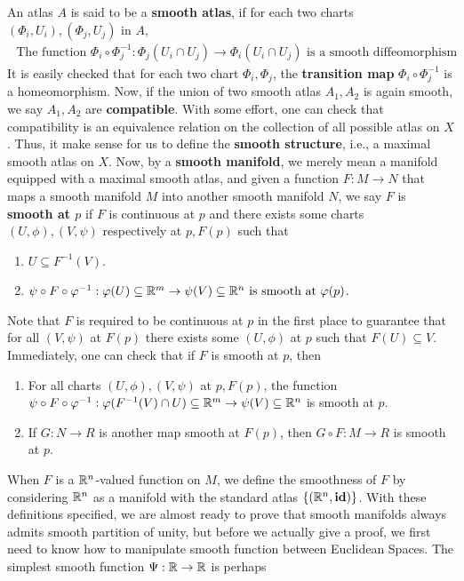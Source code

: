 \documentclass{report}
\begin{document}
\begin{mdframed}
An atlas $A$ is said to be a \textbf{smooth atlas}, if for each two charts $(\Phi_i,U_i),(\Phi_j,U_j)$ in $A$, 
\begin{align*}
\text{ The function }\Phi_i\circ \Phi_j^{-1}:\Phi_j(U_i\cap U_j)\to \Phi_i(U_i\cap U_j)\text{ is a smooth diffeomorphism }
\end{align*}
It is easily checked that for each two chart $\Phi_i,\Phi_j$, the \textbf{transition map} $\Phi_i\circ \Phi_j^{-1}$ is a homeomorphism. Now, if the union of two smooth atlas $A_1,A_2$ is again smooth, we say $A_1,A_2$ are \textbf{compatible}. With some effort, one can check that compatibility is an equivalence relation on the collection of all possible atlas on $X$. Thus, it make sense for us to define the \textbf{smooth structure}, i.e., a maximal smooth atlas on $X$. Now, by a \textbf{smooth manifold}, we merely mean a manifold equipped with a maximal smooth atlas, and given a function $F:M\rightarrow N$ that maps a smooth manifold $M$ into another smooth manifold  $N$, we say  $F$ is \textbf{smooth at $p$} if $F$ is continuous at $p$ and there exists some charts $(U,\phi),(V,\psi)$ respectively at $p,F(p)$ such that 
\begin{enumerate}[label=(\roman*)]
  \item $U \subseteq F^{-1}(V)$. 
  \item $\psi \circ F\circ \varphi^{-1} : \varphi (U) \subseteq \mathbb{R}^m \rightarrow \psi (V)\subseteq \mathbb{R}^n\text{  is smooth at }\varphi (p)$. 
\end{enumerate}
Note that $F$ is required to be continuous at $p$ in the first place to guarantee that for all $(V,\psi)$ at $F(p)$ there exists some $(U,\phi)$ at $p$ such that $F(U)\subseteq V$. Immediately, one can check that if $F$ is smooth at  $p$, then 
\begin{enumerate}[label=(\alph*)]
  \item For all charts $(U,\phi),(V,\psi)$ at $p,F(p)$, the function $\psi \circ F\circ \varphi ^{-1}:\varphi(F^{-1}(V)\cap U )\subseteq \mathbb{R}^m\rightarrow \psi  (V )\subseteq \mathbb{R}^n$ is smooth at $p$. 
  \item If $G:N\rightarrow R$ is another map smooth at $F(p)$, then $G\circ F:M\rightarrow R$ is smooth at $p$.  
\end{enumerate}
When $F$ is a $\mathbb{R}^n$-valued function on $M$, we define the smoothness of  $F$ by considering  $\mathbb{R}^n$ as a manifold with the standard atlas  $\{ (\mathbb{R}^n,\textbf{id}) \}$. With these definitions specified, we are almost ready to prove that smooth manifolds always admits smooth partition of unity, but before we actually give a proof, we first need to know how to manipulate smooth function between Euclidean Spaces. The simplest smooth function $\Psi:\mathbb{R}\rightarrow \mathbb{R}$ is perhaps 

\end{mdframed}
\end{document}
